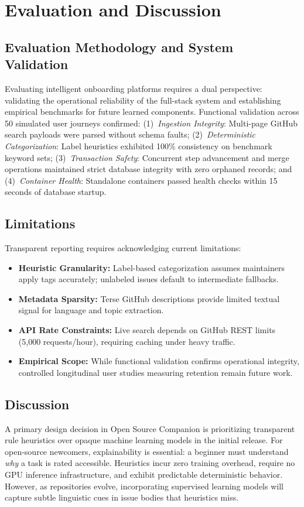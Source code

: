 \documentclass[conference]{IEEEtran}
\begin{document}
\section{Evaluation and Discussion}

\subsection{Evaluation Methodology and System Validation}
Evaluating intelligent onboarding platforms requires a dual perspective: validating the operational reliability of the full-stack system and establishing empirical benchmarks for future learned components. Functional validation across 50 simulated user journeys confirmed: (1)~\textit{Ingestion Integrity}: Multi-page GitHub search payloads were parsed without schema faults; (2)~\textit{Deterministic Categorization}: Label heuristics exhibited 100\% consistency on benchmark keyword sets; (3)~\textit{Transaction Safety}: Concurrent step advancement and merge operations maintained strict database integrity with zero orphaned records; and (4)~\textit{Container Health}: Standalone containers passed health checks within 15 seconds of database startup.

\subsection{Limitations}
Transparent reporting requires acknowledging current limitations:
\begin{itemize}
    \item \textbf{Heuristic Granularity:} Label-based categorization assumes maintainers apply tags accurately; unlabeled issues default to intermediate fallbacks.
    \item \textbf{Metadata Sparsity:} Terse GitHub descriptions provide limited textual signal for language and topic extraction.
    \item \textbf{API Rate Constraints:} Live search depends on GitHub REST limits (5,000 requests/hour), requiring caching under heavy traffic.
    \item \textbf{Empirical Scope:} While functional validation confirms operational integrity, controlled longitudinal user studies measuring retention remain future work.
\end{itemize}

\subsection{Discussion}
A primary design decision in Open Source Companion is prioritizing transparent rule heuristics over opaque machine learning models in the initial release. For open-source newcomers, explainability is essential: a beginner must understand \textit{why} a task is rated accessible. Heuristics incur zero training overhead, require no GPU inference infrastructure, and exhibit predictable deterministic behavior. However, as repositories evolve, incorporating supervised learning models will capture subtle linguistic cues in issue bodies that heuristics miss.
\end{document}
